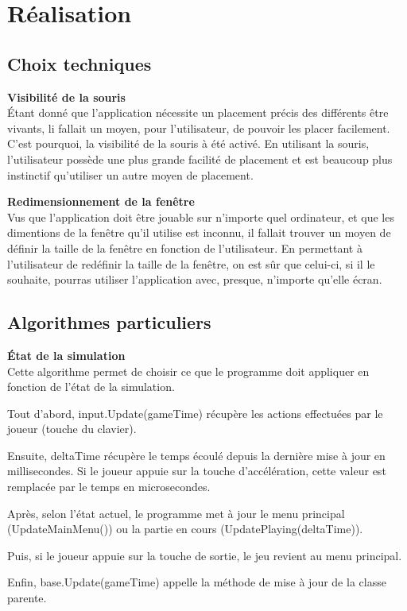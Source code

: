 \documentclass[10pt,a4paper]{article}
\begin{document}
	\section{Réalisation}
	\subsection{Choix techniques}
	\textbf{Visibilité de la souris}\\
	Étant donné que l'application nécessite un placement précis des différents être vivants, li fallait un moyen, pour l'utilisateur, de pouvoir les placer facilement. C'est pourquoi, la visibilité de la souris à été activé. En utilisant la souris, l'utilisateur possède une plus grande facilité de placement et est beaucoup plus instinctif qu'utiliser un autre moyen de placement.
	
	\textbf{Redimensionnement de la fenêtre}\\
	Vus que l'application doit être jouable sur n'importe quel ordinateur, et que les dimentions de la fenêtre qu'il utilise est inconnu, il fallait trouver un moyen de définir la taille de la fenêtre en fonction de l'utilisateur. En permettant à l'utilisateur de redéfinir la taille de la fenêtre, on est sûr que celui-ci, si il le souhaite, pourras utiliser l'application avec, presque, n'importe qu'elle écran.
	
	\subsection{Algorithmes particuliers}	
	\textbf{État de la simulation}\\
	Cette algorithme permet de choisir ce que le programme doit appliquer en fonction de l'état de la simulation. 
	
	Tout d'abord, input.Update(gameTime) récupère les actions effectuées par le joueur (touche du clavier).
	
	Ensuite, deltaTime récupère le temps écoulé depuis la dernière mise à jour en millisecondes. Si le joueur appuie sur la touche d'accélération, cette valeur est remplacée par le temps en microsecondes.
	
	Après, selon l'état actuel, le programme met à jour le menu principal (UpdateMainMenu()) ou la partie en cours (UpdatePlaying(deltaTime)).
	
	Puis, si le joueur appuie sur la touche de sortie, le jeu revient au menu principal.
	
	Enfin, base.Update(gameTime) appelle la méthode de mise à jour de la classe parente.
	
\end{document}
